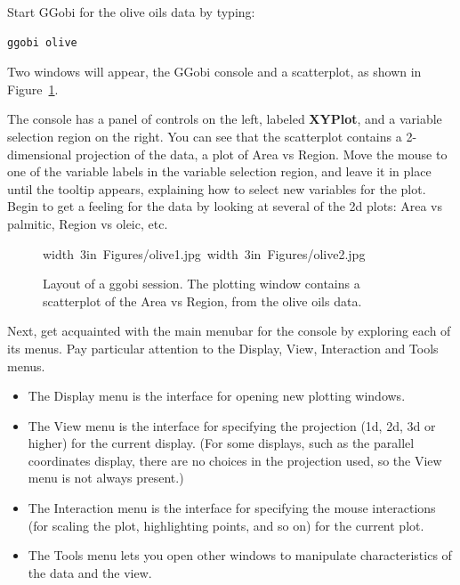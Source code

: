 \documentclass[11pt]{article}
\def\Widget#1{\textbf{#1}}
\begin{document}
Start GGobi for the olive oils data by typing:

\begin{verbatim}
ggobi olive
\end{verbatim}

Two windows will appear, the GGobi console
and a scatterplot, as shown in Figure~\ref{fig1}.

The console has a panel of controls on the left, labeled \Widget{XYPlot}, and a variable selection region on the right.  You can see
that the scatterplot contains a 2-dimensional projection of the data,
a plot of Area vs Region.  Move the mouse to one of the variable labels
in the variable selection region, and leave it in place until the
tooltip appears, explaining how to select new variables for the
plot.   Begin to get a feeling for the data by looking at several of
the 2d plots:  Area vs palmitic, Region vs oleic, etc.

\begin{figure}[h]
\hbox{\pdfimage width 3in {Figures/olive1.jpg}
      \pdfimage width 3in {Figures/olive2.jpg}
}
\caption{Layout of a ggobi session.  The plotting window contains a
scatterplot of the Area vs Region, from the olive oils data.
}%
\label{fig1}
\end{figure}

Next, get acquainted with the main menubar for the console by
exploring each of its menus.  Pay particular attention to the
Display, View, Interaction and Tools menus.

\begin {itemize}
\item The Display menu is the interface for opening new plotting
  windows.
\item The View menu is the interface for specifying the
  projection (1d, 2d, 3d or higher) for the current display.  (For
  some displays, such as the parallel coordinates display, there are
  no choices in the projection used, so the View menu is not
  always present.)
\item The Interaction menu is the interface for specifying the mouse
  interactions (for scaling the plot, highlighting points, and so on)
  for the current plot.
\item The Tools menu lets you open other windows to manipulate
  characteristics of the data and the view.
\end {itemize}
\end{document}
